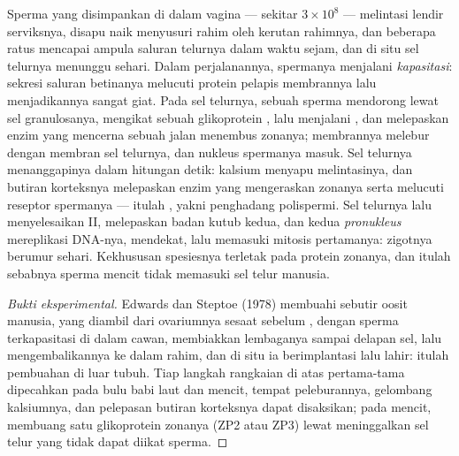 \begin{proposition}\label{prop:b2:mammal-reproduction:fertilisation}
%
Sperma yang disimpankan di dalam vagina --- sekitar $3\times 10^{8}$
--- melintasi lendir serviksnya, disapu naik menyusuri rahim oleh
kerutan rahimnya, dan beberapa ratus mencapai ampula saluran telurnya
dalam waktu sejam, dan di situ sel telurnya menunggu sehari. Dalam
perjalanannya, spermanya menjalani
\emph{kapasitasi}: sekresi saluran betinanya melucuti protein pelapis
membrannya lalu menjadikannya sangat giat. Pada sel telurnya, sebuah
sperma mendorong lewat sel granulosanya, mengikat sebuah glikoprotein
\emph{}, lalu menjalani \emph{}, dan
melepaskan enzim yang mencerna sebuah jalan menembus zonanya;
membrannya melebur dengan membran sel telurnya, dan nukleus spermanya
masuk. Sel telurnya menanggapinya dalam hitungan detik: kalsium
menyapu melintasinya, dan butiran korteksnya melepaskan enzim yang
mengeraskan zonanya serta melucuti reseptor spermanya --- itulah
\emph{}, yakni penghadang polispermi.
Sel telurnya lalu menyelesaikan  II, melepaskan badan kutub
kedua, dan kedua \emph{pronukleus}  mereplikasi DNA-nya, mendekat,
lalu memasuki mitosis pertamanya: zigotnya berumur sehari. Kekhususan
spesiesnya terletak pada protein zonanya, dan itulah sebabnya sperma
mencit tidak memasuki sel telur manusia.
\end{proposition}
\begin{proof}[Bukti eksperimental]
Edwards dan Steptoe (1978) membuahi sebutir oosit manusia, yang
diambil dari ovariumnya sesaat sebelum , dengan sperma
terkapasitasi di dalam cawan, membiakkan lembaganya sampai delapan sel,
lalu mengembalikannya ke dalam rahim, dan di situ ia berimplantasi
lalu lahir: itulah pembuahan di luar tubuh. Tiap langkah rangkaian di atas
pertama-tama dipecahkan pada bulu babi laut dan mencit, tempat
peleburannya, gelombang kalsiumnya, dan pelepasan butiran korteksnya
dapat disaksikan; pada mencit, membuang satu glikoprotein zonanya (ZP2
atau ZP3) lewat  meninggalkan sel telur yang tidak dapat
diikat sperma.
\end{proof}

